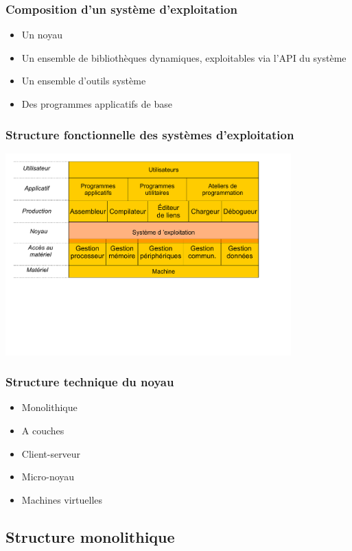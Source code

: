 \begin{frame}
\frametitle{Composition d'un système d'exploitation}
\begin{itemize}
\item Un noyau
\item Un ensemble de bibliothèques dynamiques, exploitables via l'API du système
\item Un ensemble d'outils système
\item Des programmes applicatifs de base
\end{itemize}
\end{frame}


\begin{frame}
\frametitle{Structure fonctionnelle des systèmes d'exploitation}
\includegraphics[width=11cm]{../illustration/structure_fonctionnelle.pdf}
\end{frame}

\begin{frame}
\frametitle{Structure technique du noyau}
\begin{itemize}
\item Monolithique
\item A couches
\item Client-serveur
\item Micro-noyau
\item Machines virtuelles
\end{itemize}
\end{frame}


\subsection{Structure monolithique}

